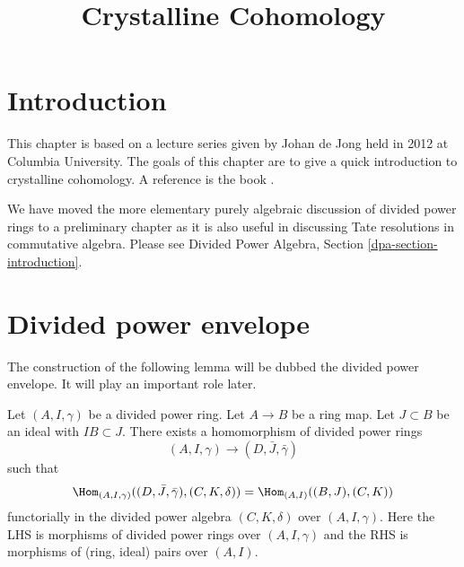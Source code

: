 

%


\title{Crystalline Cohomology}


\maketitle

\label{section-phantom}

\tableofcontents



\section{Introduction}
\label{section-introduction}

\noindent
This chapter is based on a lecture series given by Johan de Jong
held in 2012 at Columbia University.
The goals of this chapter are to give a quick introduction to
crystalline cohomology. A reference is the book \cite{Berthelot}.

\medskip\noindent
We have moved the more elementary purely algebraic discussion of divided
power rings to a preliminary chapter as it is also useful
in discussing Tate resolutions in commutative algebra.
Please see Divided Power Algebra, Section \ref{dpa-section-introduction}.













\section{Divided power envelope}
\label{section-divided-power-envelope}

\noindent
The construction of the following lemma will be dubbed the
divided power envelope. It will play an important role later.

\begin{lemma}
\label{lemma-divided-power-envelope}
Let $(A, I, \gamma)$ be a divided power ring.
Let $A \to B$ be a ring map. Let $J \subset B$ be an ideal
with $IB \subset J$. There exists a homomorphism of
divided power rings
$$
(A, I, \gamma) \longrightarrow (D, \bar J, \bar \gamma)
$$
such that
$$
\Hom_{(A, I, \gamma)}((D, \bar J, \bar \gamma), (C, K, \delta)) =
\Hom_{(A, I)}((B, J), (C, K))
$$
functorially in the divided power algebra $(C, K, \delta)$ over
$(A, I, \gamma)$. Here the LHS is morphisms of divided
power rings over $(A, I, \gamma)$ and the RHS is morphisms of
(ring, ideal) pairs over $(A, I)$.
\end{lemma}

